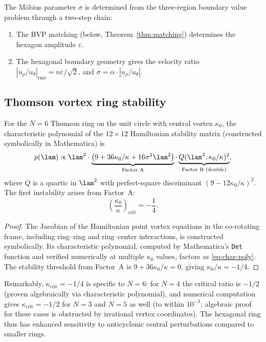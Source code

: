 The M\"obius parameter $\sigma$ is determined from the three-region
boundary value problem through a two-step chain:
\begin{enumerate}
  \item The BVP matching (below, Theorem~\ref{thm:matching}) determines
    the hexagon amplitude $\varepsilon$.
  \item The hexagonal boundary geometry gives the velocity ratio
    $|u_\rho/u_\theta|_{\mathrm{rms}} = n\varepsilon/\sqrt{2}$, and
    $\sigma = \alpha \cdot |u_\rho/u_\theta|$.
\end{enumerate}

\subsection{Thomson vortex ring stability}

\begin{proposition}\label{prop:critical-ratio}
For the $N = 6$ Thomson ring on the unit circle with central vortex
$\kappa_0$, the characteristic polynomial of the $12 \times 12$
Hamiltonian stability matrix (constructed symbolically in Mathematica) is
\begin{equation}\label{eq:char-poly}
  p(\lam) \propto \lam^2 \cdot
  \underbrace{\bigl(9 + 36\kappa_0/\kappa + 16\pi^2\lam^2\bigr)}_{\text{Factor A}} \cdot
  \underbrace{Q(\lam^2, \kappa_0/\kappa)^2}_{\text{Factor B (double)}},
\end{equation}
where $Q$ is a quartic in $\lam^2$ with perfect-square discriminant
$(9 - 12\kappa_0/\kappa)^2$.  The first instability arises from Factor~A:
\begin{equation}\label{eq:critical-ratio}
  \boxed{\left(\frac{\kappa_0}{\kappa}\right)_{\!\mathrm{crit}} = -\frac{1}{4}.}
\end{equation}
\end{proposition}

\begin{proof}
The Jacobian of the Hamiltonian point vortex equations in the co-rotating
frame, including ring--ring and ring--center interactions, is constructed
symbolically.  Its characteristic polynomial, computed by Mathematica's
\texttt{Det} function and verified numerically at multiple $\kappa_0$
values, factors as \eqref{eq:char-poly}.  The stability threshold from
Factor~A is $9 + 36\kappa_0/\kappa = 0$, giving
$\kappa_0/\kappa = -1/4$.
\end{proof}

Remarkably, $\kappa_{\mathrm{crit}} = -1/4$ is specific to $N = 6$: for
$N = 4$ the critical ratio is $-1/2$ (proven algebraically via
characteristic polynomial), and numerical computation gives
$\kappa_{\mathrm{crit}} = -1/2$ for $N = 3$ and $N = 5$ as well
(to within $10^{-3}$; algebraic proof for these cases is obstructed by
irrational vertex coordinates).  The hexagonal ring thus has enhanced
sensitivity to anticyclonic central perturbations compared to smaller
rings.

